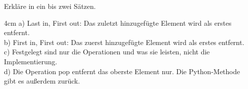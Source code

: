 \question[4]
Erkläre in ein bis zwei Sätzen.
\begin{solutionbox}{4cm}
a) Last in, First out: Das zuletzt hinzugefügte Element wird als erstes entfernt. \\
b) First in, First out: Das zuerst hinzugefügte Element wird als erstes entfernt. \\
c) Festgelegt sind nur die Operationen und was sie leisten, nicht die Implementierung. \\
d) Die Operation pop entfernt das oberste Element nur. Die Python-Methode gibt es außerdem zurück.
\end{solutionbox}
